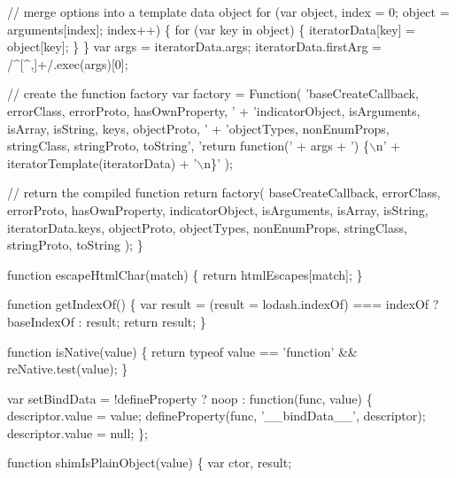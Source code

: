 \begin{DoxyCodeInclude}
      \textcolor{comment}{// merge options into a template data object}
      \textcolor{keywordflow}{for} (var \textcolor{keywordtype}{object}, index = 0; \textcolor{keywordtype}{object} = arguments[index]; index++) \{
        \textcolor{keywordflow}{for} (var key in \textcolor{keywordtype}{object}) \{
          iteratorData[key] = \textcolor{keywordtype}{object}[key];
        \}
      \}
      var args = iteratorData.args;
      iteratorData.firstArg = /^[^,]+/.exec(args)[0];

      \textcolor{comment}{// create the function factory}
      var factory = Function(
          \textcolor{stringliteral}{'baseCreateCallback, errorClass, errorProto, hasOwnProperty, '} +
          \textcolor{stringliteral}{'indicatorObject, isArguments, isArray, isString, keys, objectProto, '} +
          \textcolor{stringliteral}{'objectTypes, nonEnumProps, stringClass, stringProto, toString'},
        \textcolor{stringliteral}{'return function('} + args + \textcolor{stringliteral}{') \{\(\backslash\)n'} + iteratorTemplate(iteratorData) + \textcolor{stringliteral}{'\(\backslash\)n\}'}
      );

      \textcolor{comment}{// return the compiled function}
      \textcolor{keywordflow}{return} factory(
        baseCreateCallback, errorClass, errorProto, hasOwnProperty,
        indicatorObject, isArguments, isArray, isString, iteratorData.keys, objectProto,
        objectTypes, nonEnumProps, stringClass, stringProto, toString
      );
    \}

    \textcolor{keyword}{function} escapeHtmlChar(match) \{
      \textcolor{keywordflow}{return} htmlEscapes[match];
    \}

    \textcolor{keyword}{function} getIndexOf() \{
      var result = (result = lodash.indexOf) === indexOf ? baseIndexOf : result;
      \textcolor{keywordflow}{return} result;
    \}

    \textcolor{keyword}{function} isNative(value) \{
      \textcolor{keywordflow}{return} typeof value == \textcolor{stringliteral}{'function'} && reNative.test(value);
    \}

    var setBindData = !defineProperty ? noop : \textcolor{keyword}{function}(func, value) \{
      descriptor.value = value;
      defineProperty(func, \textcolor{stringliteral}{'\_\_bindData\_\_'}, descriptor);
      descriptor.value = null;
    \};

    \textcolor{keyword}{function} shimIsPlainObject(value) \{
      var ctor,
          result;


\end{DoxyCodeInclude}
